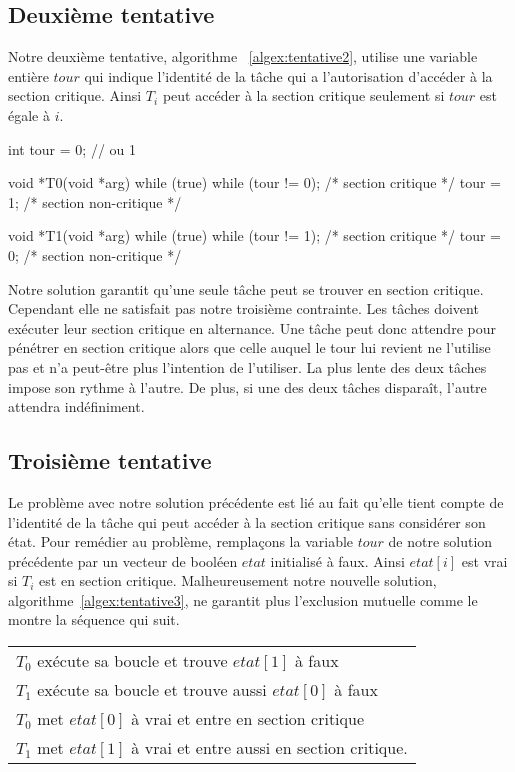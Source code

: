 \subsection*{Deuxième tentative}
Notre deuxième tentative, algorithme ~\ref{algex:tentative2}, utilise une variable entière $tour$ qui indique l'identité de la tâche qui a l'autorisation d'accéder à la section critique.
Ainsi $T_i$ peut accéder à la section critique seulement si $tour$ est égale à $i$.

\begin{codeblock}[label=algex:tentative2, title={Deuxième tentative d'exclusion mutuelle}]
int tour = 0;  // ou 1

void *T0(void *arg)
{
  while (true) {
    while (tour != 0);
    /* section critique */
    tour = 1;
    /* section non-critique */
  }
}

void *T1(void *arg)
{
  while (true) {
    while (tour != 1);
    /* section critique */
    tour = 0;
    /* section non-critique */
  }
}
\end{codeblock}

Notre solution garantit qu'une seule tâche peut se trouver en section critique.  Cependant elle ne satisfait pas notre troisième contrainte.
Les tâches doivent exécuter leur section critique en alternance.
Une tâche peut donc attendre pour pénétrer en section critique alors que celle auquel le tour lui revient ne l'utilise pas et n'a peut-être plus l'intention de l'utiliser.
La plus lente des deux tâches impose son rythme à l'autre.  De plus, si une des deux tâches disparaît, l'autre attendra indéfiniment.

\subsection*{Troisième tentative}
Le problème avec notre solution précédente est lié au fait qu'elle tient compte de l'identité de la tâche qui peut accéder à la section critique sans considérer son état.
Pour remédier au problème, remplaçons la variable $tour$ de notre solution précédente par un vecteur de booléen $etat$ initialisé à faux.
Ainsi $etat[i]$ est vrai si $T_i$ est en section critique.
Malheureusement notre nouvelle solution, algorithme~\ref{algex:tentative3}, ne garantit plus l'exclusion mutuelle comme le montre la séquence qui suit.
\par\noindent
\begin{center}
\begin{tabular}{l}
  $T_0$ exécute sa boucle et trouve $etat[1]$ à faux             \\
  $T_1$ exécute sa boucle et trouve aussi $etat [0]$ à faux      \\
  $T_0$ met $etat[0]$ à vrai et entre en section critique        \\
  $T_1$ met $etat[1]$ à vrai et entre aussi en section critique. \\
\end{tabular}
\end{center}


